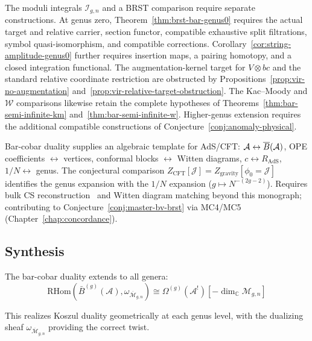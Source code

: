 \begin{remark}[Scope]
The moduli integrals $\mathcal I_{g,n}$ and a BRST comparison require separate constructions.
At genus zero, Theorem~\ref{thm:brst-bar-genus0} requires the actual target and relative carrier, section functor, compatible exhaustive split filtrations, symbol quasi-isomorphism, and compatible corrections.
Corollary~\ref{cor:string-amplitude-genus0} further requires insertion maps, a pairing homotopy, and a closed integration functional.
The augmentation-kernel target for $V\otimes bc$ and the standard relative coordinate restriction are obstructed by Propositions~\ref{prop:vir-no-augmentation} and~\ref{prop:vir-relative-target-obstruction}.
The Kac--Moody and $\mathcal W$ comparisons likewise retain the complete hypotheses of Theorems~\ref{thm:bar-semi-infinite-km} and~\ref{thm:bar-semi-infinite-w}.
Higher-genus extension requires the additional compatible constructions of Conjecture~\ref{conj:anomaly-physical}.
\end{remark}


\begin{conjecture}
\label{conj:holographic-bar-cobar}
Bar-cobar duality supplies an algebraic template for AdS/CFT: $\mathcal{A} \leftrightarrow \overline{B}(\mathcal{A})$, OPE coefficients $\leftrightarrow$ vertices, conformal blocks $\leftrightarrow$ Witten diagrams, $c \leftrightarrow R_{\mathrm{AdS}}$, $1/N \leftrightarrow$ genus.  The conjectural comparison $Z_{\mathrm{CFT}}[\mathcal{J}] = Z_{\mathrm{gravity}}[\phi_0 = \mathcal{J}]$ identifies the genus expansion with the $1/N$ expansion ($g \mapsto N^{-(2g-2)}$).  Requires bulk CS reconstruction~\cite{Wit89} and Witten diagram matching beyond this monograph; contributing to Conjecture~\ref{conj:master-bv-brst} via MC4/MC5 (Chapter~\ref{chap:concordance}).
\end{conjecture}


\subsection{Synthesis}\label{subsec:synthesis}

\begin{theorem}\label{thm:poincare-extended}
The bar-cobar duality extends to all genera:
\[\mathrm{RHom}(\bar{B}^{(g)}(\mathcal{A}), \omega_{\overline{\mathcal{M}}_{g,n}}) \cong \Omega^{(g)}(\mathcal{A}^!)[-\dim_{\mathbb{C}} \mathcal{M}_{g,n}]\]

This realizes Koszul duality geometrically at each genus level, with the
dualizing sheaf $\omega_{\overline{\mathcal{M}}_{g,n}}$ providing the
correct twist.
\end{theorem}

